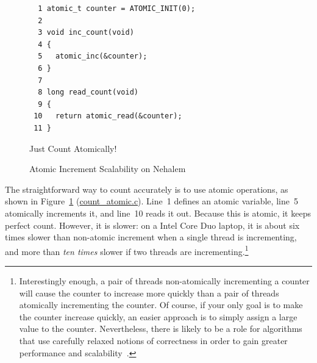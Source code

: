 \begin{figure}[tbp]
{ \scriptsize
\begin{verbatim}
  1 atomic_t counter = ATOMIC_INIT(0);
  2 
  3 void inc_count(void)
  4 {
  5   atomic_inc(&counter);
  6 }
  7 
  8 long read_count(void)
  9 {
 10   return atomic_read(&counter);
 11 }
\end{verbatim}
}
\caption{Just Count Atomically!}
\label{fig:count:Just Count Atomically!}
\end{figure}

\begin{figure}[tb]
\begin{center}
\end{center}
\caption{Atomic Increment Scalability on Nehalem}
\label{fig:count:Atomic Increment Scalability on Nehalem}
\end{figure}

The straightforward way to count accurately is to use atomic operations,
as shown in
Figure~\ref{fig:count:Just Count Atomically!} (\url{count_atomic.c}).
Line~1 defines an atomic variable, line~5 atomically increments it, and
line~10 reads it out.
Because this is atomic, it keeps perfect count.
However, it is slower: on a Intel Core Duo laptop, it is about
six times slower than non-atomic increment
when a single thread is incrementing, and more than \emph{ten times}
slower if two threads are incrementing.\footnote{
	Interestingly enough, a pair of threads non-atomically incrementing
	a counter will cause the counter to increase more quickly than
	a pair of threads atomically incrementing the counter.
	Of course, if your only goal is to make the counter increase
	quickly, an easier approach is to simply assign a large value
	to the counter.
	Nevertheless, there is likely to be a role for algorithms that
	use carefully relaxed notions of correctness in order to gain
	greater performance and
	scalability~\cite{Andrews91textbook,Arcangeli03,DavidUngar2011unsync}.}

